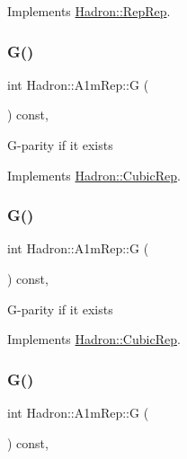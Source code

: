 Implements \mbox{\hyperlink{structHadron_1_1RepRep_a92c8802e5ed7afd7da43ccfd5b7cd92b}{Hadron\+::\+Rep\+Rep}}.

\mbox{\label{structHadron_1_1A1mRep_ab6bc5137d946f8b3d39d4ff39e92dade}} 
\subsubsection{\texorpdfstring{G()}{G()}\hspace{0.1cm}{\footnotesize\ttfamily [1/3]}}
{\footnotesize\ttfamily int Hadron\+::\+A1m\+Rep\+::G (\begin{DoxyParamCaption}{ }\end{DoxyParamCaption}) const\hspace{0.3cm}{\ttfamily [inline]}, {\ttfamily [virtual]}}

G-\/parity if it exists 

Implements \mbox{\hyperlink{structHadron_1_1CubicRep_a52104e43266d1614c00bbd1c3b395458}{Hadron\+::\+Cubic\+Rep}}.

\mbox{\label{structHadron_1_1A1mRep_ab6bc5137d946f8b3d39d4ff39e92dade}} 
\subsubsection{\texorpdfstring{G()}{G()}\hspace{0.1cm}{\footnotesize\ttfamily [2/3]}}
{\footnotesize\ttfamily int Hadron\+::\+A1m\+Rep\+::G (\begin{DoxyParamCaption}{ }\end{DoxyParamCaption}) const\hspace{0.3cm}{\ttfamily [inline]}, {\ttfamily [virtual]}}

G-\/parity if it exists 

Implements \mbox{\hyperlink{structHadron_1_1CubicRep_a52104e43266d1614c00bbd1c3b395458}{Hadron\+::\+Cubic\+Rep}}.

\mbox{\label{structHadron_1_1A1mRep_ab6bc5137d946f8b3d39d4ff39e92dade}} 
\subsubsection{\texorpdfstring{G()}{G()}\hspace{0.1cm}{\footnotesize\ttfamily [3/3]}}
{\footnotesize\ttfamily int Hadron\+::\+A1m\+Rep\+::G (\begin{DoxyParamCaption}{ }\end{DoxyParamCaption}) const\hspace{0.3cm}{\ttfamily [inline]}, {\ttfamily [virtual]}}

